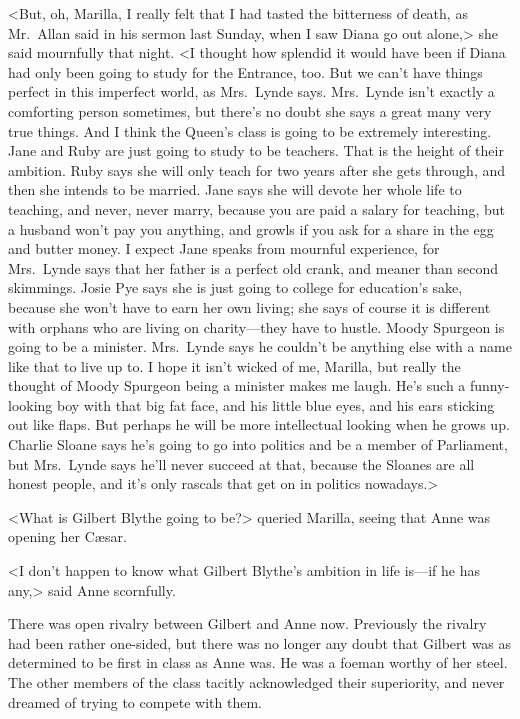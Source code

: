 <But, oh, Marilla, I really felt that I had tasted the bitterness of death, as Mr.~Allan said in his sermon last Sunday, when I saw Diana go out alone,> she said mournfully that night. <I thought how splendid it would have been if Diana had only been going to study for the Entrance, too. But we can't have things perfect in this imperfect world, as Mrs.~Lynde says. Mrs.~Lynde isn't exactly a comforting person sometimes, but there's no doubt she says a great many very true things. And I think the Queen's class is going to be extremely interesting. Jane and Ruby are just going to study to be teachers. That is the height of their ambition. Ruby says she will only teach for two years after she gets through, and then she intends to be married. Jane says she will devote her whole life to teaching, and never, never marry, because you are paid a salary for teaching, but a husband won't pay you anything, and growls if you ask for a share in the egg and butter money. I expect Jane speaks from mournful experience, for Mrs.~Lynde says that her father is a perfect old crank, and meaner than second skimmings. Josie Pye says she is just going to college for education's sake, because she won't have to earn her own living; she says of course it is different with orphans who are living on charity—they have to hustle. Moody Spurgeon is going to be a minister. Mrs.~Lynde says he couldn't be anything else with a name like that to live up to. I hope it isn't wicked of me, Marilla, but really the thought of Moody Spurgeon being a minister makes me laugh. He's such a funny-looking boy with that big fat face, and his little blue eyes, and his ears sticking out like flaps. But perhaps he will be more intellectual looking when he grows up. Charlie Sloane says he's going to go into politics and be a member of Parliament, but Mrs.~Lynde says he'll never succeed at that, because the Sloanes are all honest people, and it's only rascals that get on in politics nowadays.>

<What is Gilbert Blythe going to be?> queried Marilla, seeing that Anne was opening her Cæsar.

<I don't happen to know what Gilbert Blythe's ambition in life is—if he has any,> said Anne scornfully.

There was open rivalry between Gilbert and Anne now. Previously the rivalry had been rather one-sided, but there was no longer any doubt that Gilbert was as determined to be first in class as Anne was. He was a foeman worthy of her steel. The other members of the class tacitly acknowledged their superiority, and never dreamed of trying to compete with them.

